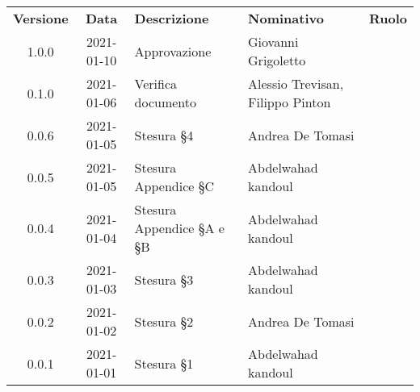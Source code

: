 {
    \renewcommand{\arraystretch}{1.5}
    \centering
    \begin{longtable}{ c c  C{3.5cm}  C{4cm}  c }
        \rowcolor{\primaryColor}
        \textcolor{\secondaryColor}{
        \textbf{Versione}}     & \textcolor{\secondaryColor}{\textbf{Data}}       & \textcolor{\secondaryColor}
        {\textbf{Descrizione}} & \textcolor{\secondaryColor}{\textbf{Nominativo}} & \textcolor{\secondaryColor}{\textbf{Ruolo}}                          \\


        1.0.0                   &2021-01-10                                        & Approvazione                                   &Giovanni Grigoletto & \responsabile{}\\
        0.1.0                  & 2021-01-06                                       & Verifica documento                            & Alessio Trevisan, Filippo Pinton &\verificatore{}\\
        0.0.6                   &2021-01-05                                        & Stesura §4                              & Andrea De Tomasi & \verificatore{} \\
        0.0.5                  & 2021-01-05                                       & Stesura Appendice §C                         & Abdelwahad kandoul & \verificatore{} \\
        0.0.4                  & 2021-01-04                                       & Stesura Appendice §A e §B                          & Abdelwahad kandoul & \verificatore{} \\
        0.0.3                  & 2021-01-03                                       & Stesura §3                            & Abdelwahad kandoul & \verificatore{} \\
        0.0.2                  & 2021-01-02                                       & Stesura §2                              & Andrea De Tomasi & \verificatore{} \\
        0.0.1                  & 2021-01-01                                       & Stesura §1                            & Abdelwahad kandoul & \verificatore{} \\
    
    
    \end{longtable}
}